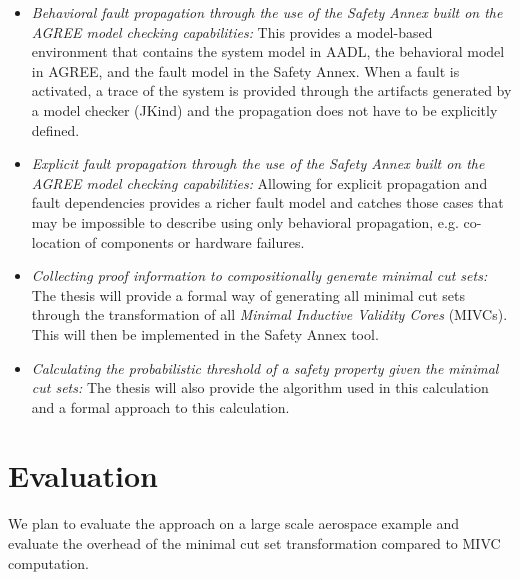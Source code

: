 \begin{itemize}
\item \emph{Behavioral fault propagation through the use of the Safety Annex built on the AGREE model checking capabilities:} This provides a model-based environment that contains the system model in AADL, the behavioral model in AGREE, and the fault model in the Safety Annex. When a fault is activated, a trace of the system is provided through the artifacts generated by a model checker (JKind) and the propagation does not have to be explicitly defined. 

\item \emph{Explicit fault propagation through the use of the Safety Annex built on the AGREE model checking capabilities:} Allowing for explicit propagation and fault dependencies provides a richer fault model and catches those cases that may be impossible to describe using only behavioral propagation, e.g. co-location of components or hardware failures. 

\item \emph{Collecting proof information to compositionally generate minimal cut sets:} The thesis will provide a formal way of generating all minimal cut sets through the transformation of all \emph{Minimal Inductive Validity Cores} (MIVCs). This will then be implemented in the Safety Annex tool. 

\item \emph{Calculating the probabilistic threshold of a safety property given the minimal cut sets:} The thesis will also provide the algorithm used in this calculation and a formal approach to this calculation.

\end{itemize}

\section{Evaluation}We plan to evaluate the approach on a large scale aerospace example and evaluate the overhead of the minimal cut set transformation compared to MIVC computation. 

